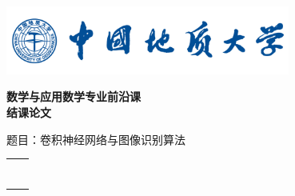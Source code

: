 \documentclass[10pt]{ctexart}
\begin{document}
	\begin{titlepage}
		\vspace*{-2cm}
		\flushleft
		\includegraphics[width=0.7\textwidth]{figs/CUGB_fig}\\
		\vspace{3.5cm}
		\begin{center}
			\textbf{\li\yihao 数学与应用数学专业前沿课\\[5pt]结课论文}
		\end{center}
		\vspace{3cm}
		\begin{center}
			\erhao \hei \parbox[t]{12cm}%
			{题目：卷积神经网络与图像识别算法}
		\end{center}
		\vspace{2cm}
		\begin{center}
			\song\sihao
			\renewcommand\arraystretch{1.5}
			\begin{tabular}{p{2cm}c}
				\makebox[2em][l]{学\qquad 院：} & \underline{\makebox[15em][c]{XX学院}} \\
				\makebox[2em][l]{班\qquad 级：} & \underline{\makebox[15em][c]{10XXXXXX}} \\
				\makebox[2em][l]{学\qquad 号：} & \underline{\makebox[15em][c]{10XXXXXXXX}} \\
				\makebox[2em][l]{姓\qquad 名：} &
				\underline{\makebox[15em][c]{XXX}}\\
				\makebox[2em][l]{导\qquad 师：} &
				\underline{\makebox[15em][c]{XXX}}\\
				\makebox[2em][l]{成\qquad 绩：} & \underline{\makebox[15em][c]{ }} \\
				\makebox[2em][l]{时\qquad 间：} & \underline{\makebox[15em][c]{\today}} \\
			\end{tabular}
			
			\vspace{3cm}
			
		\end{center}
	\end{titlepage}
	
	
	
	
	
	\xiaosihao
	\tableofcontents%
	\thispagestyle{empty}
	\clearpage
	
	\setcounter{page}{1}
	
\end{document}
